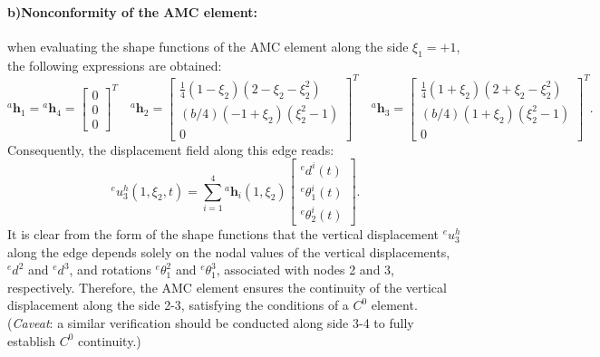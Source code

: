\documentclass[12pt]{article}
\begin{document}
\paragraph{b)Nonconformity of the AMC element:} when evaluating the shape functions of the AMC element along the side \( \xi_1 = +1 \),  the following expressions are obtained:
\begin{equation}
    \label{shape}
    {}^a\mathbf{h}_1 ={}^a\mathbf{h}_4 =
    \begin{bmatrix}
        0 \\
        0 \\
        0
    \end{bmatrix}^{T}
    \quad
    {}^a\mathbf{h}_2 =
    \begin{bmatrix}
        \frac{1}{4}(1-\xi_2)(2-\xi_2-\xi_2^2) \\
        (b/4)(-1+\xi_2)(\xi_2^2-1)            \\
        0
    \end{bmatrix}^{T}\quad   {}^a\mathbf{h}_3 =
    \begin{bmatrix}
        \frac{1}{4}(1+\xi_2)(2+\xi_2-\xi_2^2) \\
        (b/4)(1+\xi_2)(\xi_2^2-1)             \\
        0
    \end{bmatrix}^{T}.
\end{equation}
Consequently, the displacement field along this edge reads:
$$  {}^eu_3^h (1,\xi_2,t)  =\sum_{i=1}^4  {}^a\mathbf h_i(1,\xi_2)
    \begin{bmatrix}{}^ed^i(t) \\[2pt] {}^e{\theta}^i_1(t) \\[2pt] {}^e{\theta}^i_2(t)
    \end{bmatrix}.$$
It is clear from the form of the shape functions that the vertical displacement ${}^e u_3^h$ along the edge depends solely on the nodal values of the vertical displacements, ${}^e d^2$ and ${}^e d^3$, and rotations ${}^e \theta_1^2$ and ${}^e \theta_1^3$, associated with nodes 2 and 3, respectively. Therefore, the AMC element ensures the continuity of the vertical displacement along the side 2-3, satisfying the conditions of a $C^0$ element. (\emph{Caveat}: a similar verification should be conducted along side 3-4 to fully establish $C^0$ continuity.)
\end{document}
